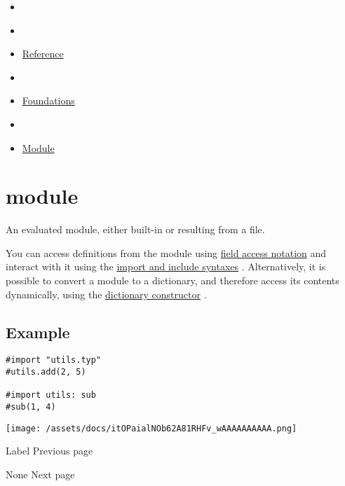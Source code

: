 \begin{itemize}
\tightlist
\item
  \href{/docs}{}
\item
  
\item
  \href{/docs/reference/}{Reference}
\item
  
\item
  \href{/docs/reference/foundations/}{Foundations}
\item
  
\item
  \href{/docs/reference/foundations/module/}{Module}
\end{itemize}

\section{\texorpdfstring{{ module }}{ module }}\label{summary}

An evaluated module, either built-in or resulting from a file.

You can access definitions from the module using
\href{/docs/reference/scripting/\#fields}{field access notation} and
interact with it using the
\href{/docs/reference/scripting/\#modules}{import and include syntaxes}
. Alternatively, it is possible to convert a module to a dictionary, and
therefore access its contents dynamically, using the
\href{/docs/reference/foundations/dictionary/\#constructor}{dictionary
constructor} .

\subsection{Example}\label{example}

\begin{verbatim}
#import "utils.typ"
#utils.add(2, 5)

#import utils: sub
#sub(1, 4)
\end{verbatim}

\texttt{[image: /assets/docs/itOPaialNOb62A81RHFv\_wAAAAAAAAAA.png]}

\href{/docs/reference/foundations/label/}{\pandocbounded{}}

{ Label } { Previous page }

\href{/docs/reference/foundations/none/}{\pandocbounded{}}

{ None } { Next page }


